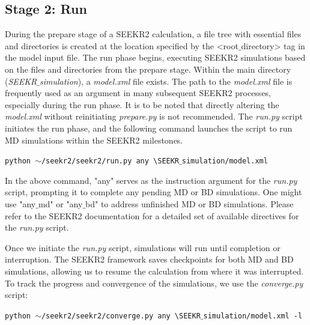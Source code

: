 \documentclass[9pt,training,pubversion]{livecoms}
\begin{document}
\subsection*{Stage 2: Run}
\vspace{2mm}

\noindent During the prepare stage of a SEEKR2 calculation, a file tree with essential files and directories is created at the location specified by the  <root$\_$directory> tag in the model input file. The run phase begins, executing SEEKR2  simulations based on the files and directories from the prepare stage. Within the main directory (\textit{SEEKR$\_$simulation}), a \textit{model.xml} file exists. The path to the \textit{model.xml} file is frequently used as an argument in many subsequent SEEKR2 processes, especially during the run phase. It is to be noted that directly altering the \textit{model.xml} without reinitiating \textit{prepare.py} is not recommended. The \textit{run.py} script initiates the run phase, and the following command launches the script to run MD simulations within the SEEKR2 milestones.

\begin{tcolorbox}[colback=black!8!white, colframe=black!50!black, fontlower=\tiny, left=2pt, right=2pt, top=2pt, bottom=2pt] 
\texttt{python $\sim$/seekr2/seekr2/run.py any \textbackslash \linebreak SEEKR$\_$simulation/model.xml}
\end{tcolorbox}

\noindent In the above command, "any" serves as the instruction argument for the \textit{run.py} script, prompting it to complete any pending MD or BD simulations. One might use "any$\_$md" or "any$\_$bd" to address unfinished MD or BD simulations. Please refer to the SEEKR2 documentation for a detailed set of available directives for the \textit{run.py} script.

\noindent Once we initiate the \textit{run.py} script, simulations will run until completion or interruption. The SEEKR2 framework saves checkpoints for both MD and BD simulations, allowing us to resume the calculation from where it was interrupted. To track the progress and convergence of the simulations, we  use the \textit{converge.py} script:

\begin{tcolorbox}[colback=black!8!white, colframe=black!50!black, fontlower=\tiny, left=2pt, right=2pt, top=2pt, bottom=2pt] 
\texttt{python $\sim$/seekr2/seekr2/converge.py any \textbackslash \linebreak SEEKR$\_$simulation/model.xml -l}
\end{tcolorbox}
\end{document}
